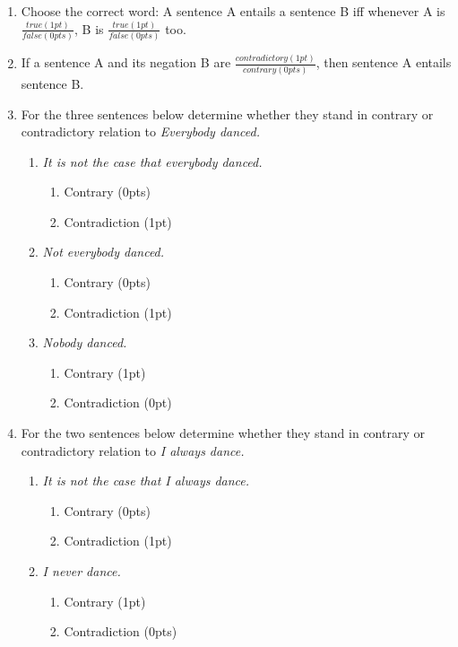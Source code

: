 \documentclass[a4]{article}
\begin{document}
\begin{enumerate}
 \item Choose the correct word: A sentence A entails a sentence B iff whenever A is $\frac{true (1pt)}{false (0pts)}$, B is $\frac{true (1pt)}{false (0pts)}$ too. 

\item If a sentence A and its negation B are  $\frac{contradictory (1pt)}{contrary (0pts)}$, then sentence A entails sentence B. 

\item For the three sentences below determine whether they stand in contrary or contradictory relation to \textit{Everybody danced.}
\begin{enumerate}[noitemsep]
    \item \textit{It is not the case that everybody danced.}
    \begin{enumerate}
        \item Contrary (0pts)
        \item Contradiction (1pt)
    \end{enumerate}
     \item \textit{Not everybody danced.}
         \begin{enumerate}
        \item Contrary (0pts)
        \item Contradiction (1pt)
    \end{enumerate}
     \item \textit{Nobody danced.}
         \begin{enumerate}
        \item Contrary (1pt)
        \item Contradiction (0pt)
    \end{enumerate}
\end{enumerate}

\item For the two sentences below determine whether they stand in contrary or contradictory relation to \textit{I always dance.}
\begin{enumerate}[noitemsep]
    \item \textit{It is not the case that I always dance.}
        \begin{enumerate}
        \item Contrary (0pts)
        \item Contradiction (1pt)
    \end{enumerate}
     \item \textit{I never dance.}
         \begin{enumerate}
        \item Contrary (1pt)
        \item Contradiction (0pts)
    \end{enumerate}
\end{enumerate}



\end{enumerate}
\end{document}
